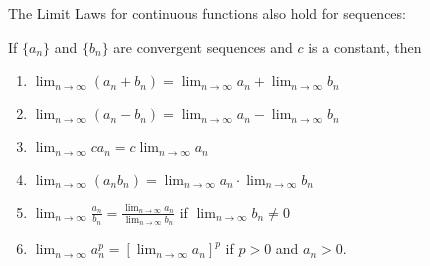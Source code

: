 \begin{frame}
The Limit Laws for continuous functions also hold for sequences:

If $\{ a_n\}$ and $\{ b_n\}$ are convergent sequences and $c$ is a constant, then
\begin{enumerate}
\item  $\displaystyle \lim_{n\to\infty}(a_n+b_n) = \lim_{n\to\infty}a_n +\lim_{n\to\infty}b_n$
\item  $\displaystyle \lim_{n\to\infty}(a_n-b_n) = \lim_{n\to\infty}a_n -\lim_{n\to\infty}b_n$
\item  $\displaystyle \lim_{n\to\infty}ca_n = c\lim_{n\to\infty}a_n$
\item  $\displaystyle \lim_{n\to\infty}(a_n b_n) = \lim_{n\to\infty}a_n \cdot \lim_{n\to\infty}b_n$
\item  $\displaystyle \lim_{n\to\infty}\frac{a_n}{ b_n} = \frac{\displaystyle \lim_{n\to\infty}a_n}{\displaystyle  \lim_{n\to\infty}b_n}$ if $\lim_{n\to\infty}b_n\neq 0$
\item  $\displaystyle \lim_{n\to\infty}a_n^p = \left[ \lim_{n\to\infty}a_n\right]^p$ if $p > 0$ and $a_n > 0$.
\end{enumerate}
\end{frame}
